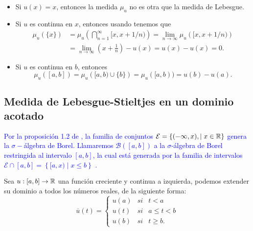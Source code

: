 \begin{obs} \vphantom{a}
	\begin{itemize} 
		\item Si $u(x)=x$, entonces la medida $\mu_{u}$ no es otra que la medida de Lebesgue.
		\item Si $u$ es continua   en $x$, entonces usando  \cite[Teorema 3.28]{Zo} tenemos que 		
		\begin{equation*}
            \begin{split}
			\mu_{u}(\{x\})&=\mu_{u}\left( \bigcap_{n=1}^{\infty}[x,x+1/n)\right) =\lim_{n \to \infty}\mu_{u}\left([x,x+1/n)\right)
			\\ &=\lim_{n \to \infty}\left(x+\frac{1}{n}\right)-u(x)=u(x)-u(x)=0.
            \end{split}
		\end{equation*}
		
		\item  Si $u$ es continua  en $b$, entonces 
		$$\mu_{u}([a,b])=\mu_{u}\left([a,b) \cup\{b\}\right)=\mu_{u}([a,b))=u(b)-u(a).$$		
	\end{itemize}
\end{obs}

\subsection{Medida de  Lebesgue-Stieltjes en un dominio acotado}
\textcolor{blue}{ Por la proposición 1.2 de \cite{folland}, la familia de conjuntos $\mathcal{E}=\{(-\infty,x),\mid x\in\mathbb{R}\}$ genera la $\sigma-$álgebra de Borel. Llamaremos $\mathscr{B}([a,b])$  a la $\sigma$-álgebra de Borel restringida al intervalo $[a,b]$, la cual  está generada por la familia de intervalos $\mathcal{E}\cap [a,b]=\left\lbrace [a,x) \mid x\leq b\right\rbrace $ .}
 
Sea $u:[a,b]\to\mathbb{R}$ una función  creciente y continua a izquierda, podemos extender su dominio a todos los números reales, de la siguiente forma:
$$\overline{u}(t)=\left\lbrace \begin{array}{rll}
	u(a) &si & t<a\\
	u(t) & si & a\leq t < b\\
	u(b)& si & t\geq b.
\end{array}\right. $$ 


